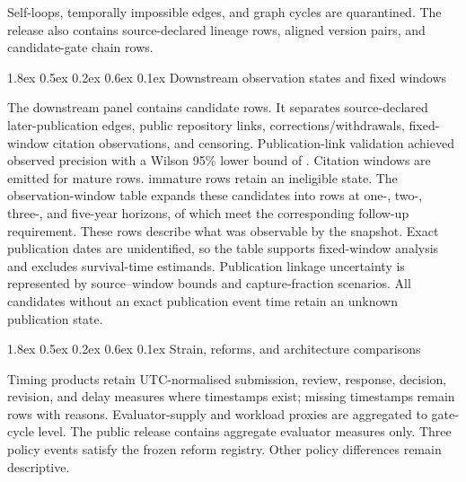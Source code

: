 \documentclass[
  10pt,
]{article}
\makeatletter
\renewcommand\subsubsection{\@startsection{subsubsection}{3}{\z@}%
  {1.8ex \@plus 0.5ex \@minus 0.2ex}%
  {0.6ex \@plus 0.1ex}%
  {\normalfont\normalsize\sffamily\bfseries\color{OSGInk}}}
\makeatother
\begin{document}
Self-loops, temporally impossible edges, and graph cycles are
quarantined. The release also contains \OSGClaimSourceDeclaredLineageEdges{}
source-declared lineage rows, \OSGClaimVersionAlignments{} aligned version
pairs, and \OSGClaimCandidateGateChains{} candidate-gate chain rows.

\subsubsection{Downstream observation states and fixed windows}
\label{55-downstream-observation-states-and-fixed-windows}

The downstream panel contains \OSGClaimAfterlifeCandidates{} candidate rows.
It separates source-declared
later-publication edges, public repository links,
corrections/withdrawals, fixed-window citation observations, and
censoring. Publication-link validation achieved observed precision
\OSGClaimPublicationLinkPrecision{} with a Wilson 95\% lower bound of
\OSGClaimPublicationLinkPrecisionLower{}.
Citation windows are emitted for mature rows.
\OSGClaimImmatureOutcomesExcluded{} immature rows retain an ineligible
state.
The observation-window table expands these candidates into
\OSGClaimPublicationObservationWindowRows{} rows at one-, two-, three-,
and five-year horizons, of which \OSGClaimMatureObservationWindowRows{}
meet the corresponding follow-up requirement. These rows describe what
was observable by the snapshot. Exact publication dates are
unidentified, so the table supports fixed-window analysis and excludes
survival-time estimands. Publication linkage uncertainty is represented by \OSGClaimPublicationLinkageBoundRows{}
source--window bounds and capture-fraction scenarios. All
\OSGClaimPublicationEventTimesUnidentified{} candidates without an exact
publication event time retain an unknown publication state.

\subsubsection{Strain, reforms, and architecture
comparisons}\label{56-strain-reforms-and-architecture-comparisons}

Timing products retain UTC-normalised submission, review, response,
decision, revision, and delay measures where timestamps exist; missing
timestamps remain rows with reasons. Evaluator-supply and workload
proxies are aggregated to gate-cycle level. The public release contains
aggregate evaluator measures only. Three policy events satisfy the
frozen reform registry. Other policy differences remain descriptive.
\end{document}

